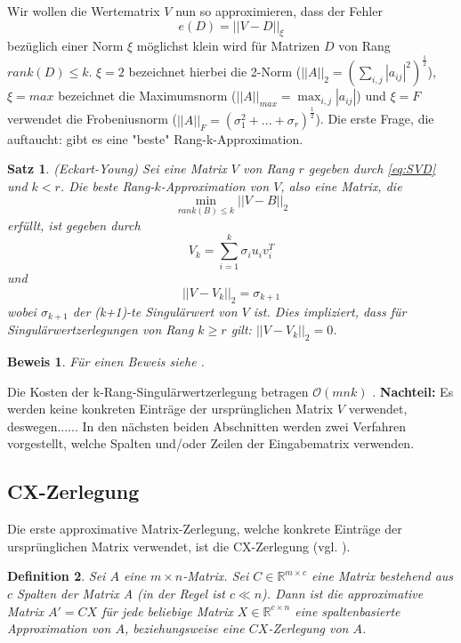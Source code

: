 \documentclass[12pt,a4paper,twoside]{article}
\newtheorem{Satz}{Satz}[section]
\newtheorem{Definition}[Satz]{Definition}
\newtheorem{Beweis}{Beweis}
\begin{document}
		\newline 
		\newline
		Wir wollen die Wertematrix $V$ nun so approximieren, dass der Fehler 
		\begin{equation*}
			e(D)=||V-D||_\xi
		\end{equation*}
		bezüglich einer Norm $\xi$ möglichst klein wird für Matrizen $D$ von Rang $rank(D)\leq k$. $\xi=2$ bezeichnet hierbei die 2-Norm ($||A||_2=\left(\sum_{i,j}|a_{ij}|^2\right)^\frac{1}{2}$), $\xi=max$ bezeichnet die Maximumsnorm ($||A||_{max}=\max_{i,j}|a_{ij}|$) und $\xi=F$ verwendet die Frobeniusnorm ($||A||_F=(\sigma_1^2+...+\sigma_r)^\frac{1}{2}$).
		\newline
		\newline
		Die erste Frage, die auftaucht: gibt es eine "beste" Rang-k-Approximation.
		\begin{Satz}{(Eckart-Young)}
			Sei eine Matrix $V$ von Rang $r$ gegeben durch \ref{eq:SVD} und $k<r$. Die beste Rang-$k$-Approximation 
			von $V$, also eine Matrix, die
			\begin{equation*}
				\min_{rank(B)\leq k}||V-B||_2	
			\end{equation*}		
			erfüllt, ist gegeben durch
			\begin{equation*}
				 V_k=\sum_{i=1}^k\sigma_i u_i v_i^T
			\end{equation*}
			und 
			\begin{equation*}
				||V-V_k||_2=\sigma_{k+1}
			\end{equation*}
			wobei $\sigma_{k+1}$ der (k+1)-te Singulärwert von $V$ ist. Dies impliziert, dass für Singulärwertzerlegungen von Rang $k\geq r$ gilt: $||V-V_k||_2=0$.
		\end{Satz}
		\begin{Beweis}
			Für einen Beweis siehe \cite{Golub2013}.
		\end{Beweis}
		Die Kosten der k-Rang-Singulärwertzerlegung betragen $\mathcal{O}(mnk)$ \citep{Wang2013}. \newline
		\newline
		\textbf{Nachteil:} Es werden keine konkreten Einträge der ursprünglichen Matrix $V$ verwendet, deswegen......\newline
		\newline
		In den nächsten beiden Abschnitten werden zwei Verfahren vorgestellt, welche Spalten und/oder Zeilen der 
		Eingabematrix verwenden.
	\subsection{CX-Zerlegung}
		\label{subsec:CX}
		Die erste approximative Matrix-Zerlegung, welche konkrete Einträge der ursprünglichen Matrix verwendet, ist die CX-Zerlegung (vgl. \citep{Drineas2009}). 
		\begin{Definition}
			Sei $A$ eine $m\times n$-Matrix. Sei $C\in \mathds{R}^{m\times c}$ eine Matrix bestehend aus $c$ Spalten der Matrix A (in der Regel ist $c\ll n$). Dann ist die approximative Matrix $A'=CX$ für jede beliebige Matrix $X\in \mathds{R}^{c\times n}$ eine spaltenbasierte Approximation von $A$, beziehungsweise eine $CX$-Zerlegung von $A$.
		\end{Definition}
\end{document}
